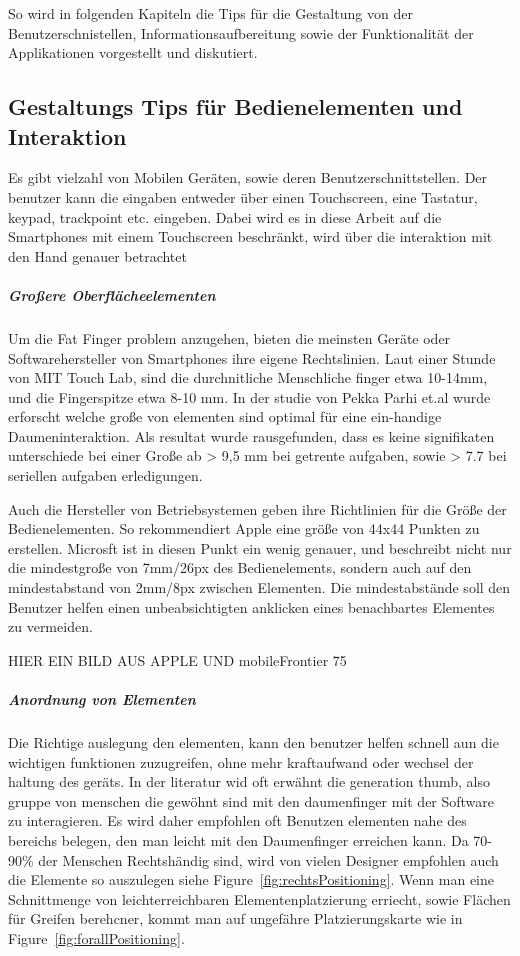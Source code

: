 So wird in folgenden Kapiteln die Tips für die Gestaltung von der Benutzerschnistellen, Informationsaufbereitung sowie der Funktionalität der Applikationen vorgestellt und diskutiert.


\subsection{Gestaltungs Tips für Bedienelementen und Interaktion}
\label{sub:Benutzerschnittstellen}

Es gibt vielzahl von Mobilen Geräten, sowie deren Benutzerschnittstellen. Der benutzer kann die eingaben entweder über einen Touchscreen, eine Tastatur, keypad, trackpoint etc. eingeben. Dabei wird es in diese Arbeit auf die Smartphones mit einem Touchscreen beschränkt, wird über die interaktion mit den Hand genauer betrachtet

\subparagraph{Großere Oberflächeelementen} 
\label{subp:gro_ere_interface_elementen}

Um die Fat Finger problem anzugehen, bieten die meinsten Geräte oder Softwarehersteller von Smartphones ihre eigene Rechtslinien. Laut einer Stunde von MIT Touch Lab, sind die durchnitliche Menschliche finger etwa 10-14mm, und die Fingerspitze etwa 8-10 mm\cite{Srinivasan:2003uu}. In der studie von Pekka Parhi et.al\cite{Parhi:2006gh} wurde erforscht welche große von elementen sind optimal für eine ein-handige Daumeninteraktion. Als resultat wurde rausgefunden, dass es keine signifikaten unterschiede bei einer Große ab > 9,5 mm bei getrente aufgaben, sowie > 7.7 bei seriellen aufgaben erledigungen.  

Auch die Hersteller von Betriebsystemen geben ihre Richtlinien für die Größe der Bedienelementen. So rekommendiert Apple eine größe von 44x44 Punkten zu erstellen\cite{Apple}. Microsft ist in diesen Punkt ein wenig genauer, und beschreibt nicht nur die mindestgroße von 7mm/26px des Bedienelements, sondern auch auf den mindestabstand von 2mm/8px zwischen Elementen\cite{lukeGUI}. Die mindestabstände soll den Benutzer helfen einen unbeabsichtigten anklicken eines benachbartes Elementes zu vermeiden. 

HIER EIN BILD AUS APPLE UND mobileFrontier 75

\subparagraph{Anordnung von Elementen} 
\label{subp:anordnung_von_elementen}

Die Richtige auslegung den elementen, kann den benutzer helfen schnell aun die wichtigen funktionen zuzugreifen, ohne mehr kraftaufwand oder wechsel der haltung des geräts. In der literatur wid oft erwähnt die generation thumb, also gruppe von menschen die gewöhnt sind mit den daumenfinger mit der Software zu interagieren. Es wird daher empfohlen oft Benutzen elementen nahe des bereichs belegen, den man leicht mit den Daumenfinger erreichen kann. Da 70-90\% der Menschen  Rechtshändig sind, wird von vielen Designer empfohlen auch die Elemente so auszulegen siehe Figure~\ref{fig:rechtsPositioning}. Wenn man eine Schnittmenge von leichterreichbaren Elementenplatzierung erriecht, sowie Flächen für Greifen berehcner, kommt man auf ungefähre Platzierungskarte wie in Figure~\ref{fig:forallPositioning}. 

